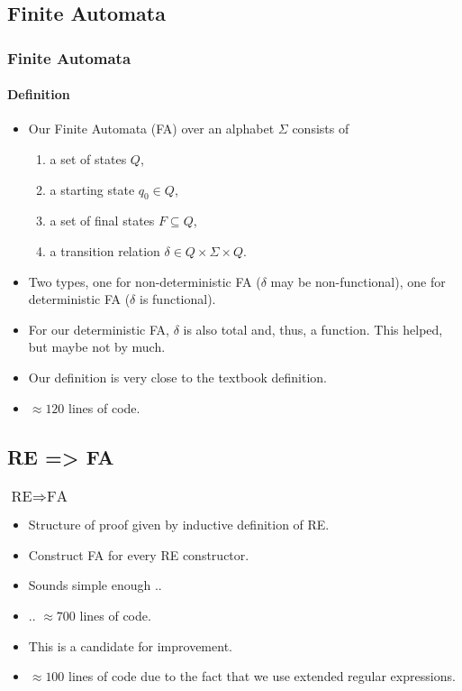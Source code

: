 \documentclass{beamer}
\begin{document}
\subsection*{Finite Automata}
\begin{frame}
    \frametitle{Finite Automata}
    \framesubtitle{Definition}
    \begin{itemize}
        \item 
            Our Finite Automata (FA) over an alphabet $\Sigma$ consists of
            \begin{enumerate}
                \item a set of states $Q$,
                \item a starting state $q_0 \in Q$,
                \item a set of final states $F \subseteq Q$,
                \item a transition relation $\delta \in Q \times \Sigma \times Q$.
            \end{enumerate}
        \item Two types, one for non-deterministic FA ($\delta$ may be non-functional), one for deterministic FA ($\delta$ is functional).
        \item For our deterministic FA, $\delta$ is also total and, thus, a function. This helped, but maybe not by much.
        \item Our definition is very close to the textbook definition.
        \item $\approx 120$ lines of code.
    \end{itemize}
\end{frame}

\subsection*{RE => FA}
\begin{frame}
    \frametitle{$\mbox{RE} \Rightarrow \mbox{FA}$}
    \begin{itemize}
        \item Structure of proof given by inductive definition of RE.
        \item Construct FA for every RE constructor.
        \item Sounds simple enough ..
        \item .. $\approx 700$ lines of code.
        \item This is a candidate for improvement.
        \item $\approx 100$ lines of code due to the fact that we use extended regular expressions.
    \end{itemize}
\end{frame}
\end{document}
